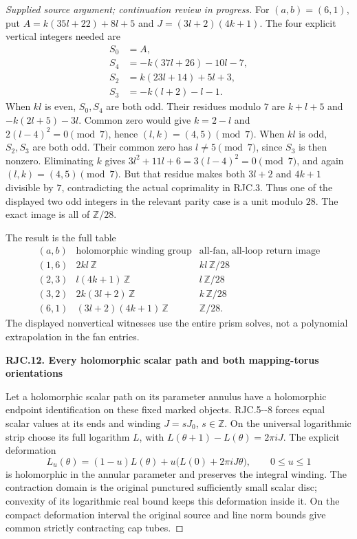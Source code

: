 \begin{proof}[Supplied source argument; continuation review in progress]
For \((a,b)=(6,1)\), put
\(A=k(35l+22)+8l+5\) and
\(J=(3l+2)(4k+1)\).
The four explicit vertical integers
needed are
\[
 \begin{split}
 S_0&=A,\\
 S_4&=-k(37l+26)-10l-7,\\
 S_2&=k(23l+14)+5l+3,\\
 S_3&=-k(l+2)-l-1.
 \end{split}
 \tag{RJC.83}
\]
When \(kl\) is even, \(S_0,S_4\)
are both odd. Their residues modulo
\(7\) are \(k+l+5\) and
\(-k(2l+5)-3l\).
Common zero would give \(k=2-l\)
and \(2(l-4)^2=0\pmod7\), hence
\((l,k)=(4,5)\pmod7\).
When \(kl\) is odd, \(S_2,S_3\)
are both odd. Their common zero
has \(l\ne5\pmod7\), since
\(S_3\) is then nonzero.
Eliminating \(k\) gives
\(3l^2+11l+6=3(l-4)^2=0\pmod7\),
and again \((l,k)=(4,5)\pmod7\).
But that residue makes both
\(3l+2\) and \(4k+1\) divisible
by \(7\), contradicting the
actual coprimality in RJC.3.
Thus one of the displayed two
odd integers in the relevant
parity case is a unit modulo
\(28\). The exact image is all
of \(\mathbb Z/28\).

The result is the full table
\[
 \begin{array}{c|c|c}
 (a,b)&\text{holomorphic winding group}&
 \text{all-fan, all-loop return image}\\ \hline
 (1,6)&2kl\,\mathbb Z&kl\,\mathbb Z/28\\
 (2,3)&l(4k+1)\,\mathbb Z&l\,\mathbb Z/28\\
 (3,2)&2k(3l+2)\,\mathbb Z&k\,\mathbb Z/28\\
 (6,1)&(3l+2)(4k+1)\,\mathbb Z&\mathbb Z/28 .
 \end{array}
 \tag{RJC.84}
\]
The displayed nonvertical witnesses use
the entire prism solves, not a polynomial
extrapolation in the fan entries.

\par

\medskip\noindent\textbf{RJC.12. Every holomorphic scalar path and both mapping-torus orientations}

\par\nobreak

Let a holomorphic scalar path on its
parameter annulus have a holomorphic
endpoint identification on these fixed
marked objects. RJC.5-\/-8 forces equal
scalar values at its ends and winding
\(J=sJ_0\), \(s\in\mathbb Z\).
On the universal logarithmic strip
choose its full logarithm \(L\), with
\(L(\theta+1)-L(\theta)=2\pi iJ\).
The explicit deformation
\[
 L_u(\theta)=(1-u)L(\theta)
       +u\bigl(L(0)+2\pi iJ\theta\bigr),
 \qquad 0\le u\le1
 \tag{RJC.85}
\]
is holomorphic in the annular parameter
and preserves the integral winding.
The contraction domain is the original
punctured sufficiently small scalar
disc; convexity of its logarithmic
real bound keeps this deformation
inside it. On the compact deformation
interval the original source and line
norm bounds give common strictly
contracting cap tubes.


\end{proof}
